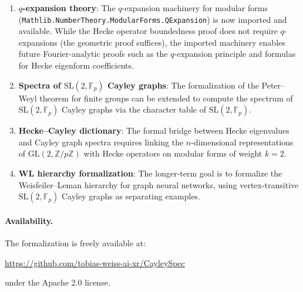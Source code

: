 \documentclass[11pt]{article}
\theoremstyle{plain}
\theoremstyle{definition}
\theoremstyle{remark}
\begin{document}
\begin{enumerate}
  \item \textbf{$q$-expansion theory}: The $q$-expansion machinery for modular forms (\texttt{Mathlib.NumberTheory.ModularForms.QExpansion}) is now imported and available. While the Hecke operator boundedness proof does not require $q$-expansions (the geometric proof suffices), the imported machinery enables future Fourier-analytic proofs such as the $q$-expansion principle and formulas for Hecke eigenform coefficients.
  \item \textbf{Spectra of $\mathrm{SL}(2,\mathbb{F}_p)$ Cayley graphs}: The formalization of the Peter--Weyl theorem for finite groups can be extended to compute the spectrum of $\mathrm{SL}(2,\mathbb{F}_p)$ Cayley graphs via the character table of $\mathrm{SL}(2,\mathbb{F}_p)$.
  \item \textbf{Hecke--Cayley dictionary}: The formal bridge between Hecke eigenvalues and Cayley graph spectra requires linking the $n$-dimensional representations of $\mathrm{GL}(2,\mathbb{Z}/p\mathbb{Z})$ with Hecke operators on modular forms of weight $k=2$.
  \item \textbf{WL hierarchy formalization}: The longer-term goal is to formalize the Weisfeiler--Leman hierarchy for graph neural networks, using vertex-transitive $\mathrm{SL}(2,\mathbb{F}_p)$ Cayley graphs as separating examples.
\end{enumerate}

\paragraph{Availability.}
The formalization is freely available at:
\begin{center}
\url{https://github.com/tobias-weiss-ai-xr/CayleySpec}
\end{center}
under the Apache 2.0 license.
\end{document}
